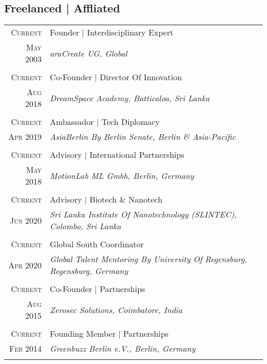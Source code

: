 \subsection{Freelanced | Affliated}
\begin{longtable}
	{r|p{12cm}}

	\textsc{Current} & Founder | Interdisciplinary Expert\\
	\textsc{May 2003}&\emph{araCreate UG, Global}\\
	\multicolumn{2}{c}{} \\

	\textsc{Current} & Co-Founder | Director Of Innovation\\
	\textsc{Aug 2018}&\emph{DreamSpace Academy, Batticaloa, Sri Lanka}\\
	\multicolumn{2}{c}{} \\

	\textsc{Current} & Ambassador | Tech Diplomacy\\
	\textsc{Apr 2019}&\emph{AsiaBerlin By Berlin Senate, Berlin \& Asia-Pacific}\\
	\multicolumn{2}{c}{} \\

	\textsc{Current} & Advisory | International Partnerships\\
	\textsc{May 2018}&\emph{MotionLab ML Gmbh, Berlin, Germany}\\
	\multicolumn{2}{c}{} \\

	\textsc{Current} & Advisory | Biotech \& Nanotech\\
	\textsc{Jun 2020}&\emph{Sri Lanka Institute Of Nanotechnology (SLINTEC), Colombo, Sri Lanka}\\
	\multicolumn{2}{c}{} \\

	\textsc{Current} & Global South Coordinator\\
	\textsc{Apr 2020}&\emph{Global Talent Mentoring By University Of Regensburg, Regensburg, Germany}\\
	\multicolumn{2}{c}{} \\

	\textsc{Current} & Co-Founder | Partnerships\\
	\textsc{Aug 2015}&\emph{Zerosec Solutions, Coimbatore, India}\\
	\multicolumn{2}{c}{} \\

	\textsc{Current} & Founding Member | Partnerships\\
	\textsc{Feb 2014}&\emph{Greenbuzz Berlin e.V., Berlin, Germany}\\
	\multicolumn{2}{c}{} \\


\end{longtable}
